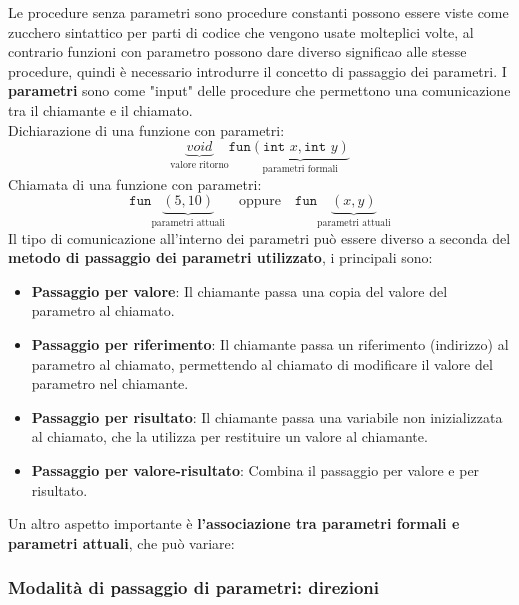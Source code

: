 \documentclass[a4paper]{article}
\begin{document}
Le procedure senza parametri sono procedure constanti possono essere 
viste come zucchero sintattico per parti di codice che vengono usate molteplici volte, al contrario
funzioni con parametro possono dare diverso significao alle stesse procedure, 
quindi è necessario introdurre il concetto di passaggio dei parametri.
I \textbf{parametri} sono come "input" delle procedure che permettono una comunicazione 
tra il chiamante e il chiamato.\\
Dichiarazione di una funzione con parametri:
\[
  \underbrace{void}_{\text{valore ritorno}} \texttt{fun} \underbrace{(\texttt{int } x, \texttt{int } y)}_{\text{parametri formali}}
\]
Chiamata di una funzione con parametri:
\[
  \texttt{fun} \underbrace{(5, 10)}_{\text{parametri attuali}} \quad \text{oppure} \quad \texttt{fun} \underbrace{(x, y)}_{\text{parametri attuali}}
\]
Il tipo di comunicazione all'interno dei parametri può essere diverso 
a seconda del \textbf{metodo di passaggio dei parametri utilizzato}, i principali sono:
\begin{itemize}
  \item \textbf{Passaggio per valore}: Il chiamante passa una copia del valore del parametro al chiamato.
  \item \textbf{Passaggio per riferimento}: Il chiamante passa un riferimento (indirizzo) al parametro al chiamato, 
  permettendo al chiamato di modificare il valore del parametro nel chiamante.
  \item \textbf{Passaggio per risultato}: Il chiamante passa una variabile non inizializzata al chiamato,
   che la utilizza per restituire un valore al chiamante.
    \item \textbf{Passaggio per valore-risultato}: Combina il passaggio per valore e per risultato.
\end{itemize}
Un altro aspetto importante è \textbf{l'associazione tra parametri formali e parametri attuali}, che può variare:

\subsubsection{Modalità di passaggio di parametri: direzioni}
\end{document}
